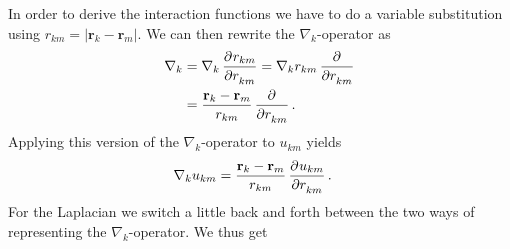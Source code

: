 \documentclass[
    a4paper, aps, twocolumn, floatfix, superscriptaddress]{revtex4-1}
\newcommand{\vf}{\mathbf}
\newcommand{\1}{\mathds{1}}
\begin{document}
            In order to derive the interaction functions we have to do a
            variable substitution using $r_{km} = |\vf{r}_k - \vf{r}_m|$. We can
            then rewrite the $\nabla_k$-operator as
            \begin{align}
                \nabla_k
                &=
                \nabla_k
                \dpd[]{r_{km}}{r_{km}}
                =
                \nabla_k r_{km} \dpd[]{}{r_{km}}
                \\
                &=
                \frac{\vf{r}_k - \vf{r}_m}{r_{km}}\dpd[]{}{r_{km}}.
            \end{align}
            Applying this version of the $\nabla_k$-operator to $u_{km}$ yields
            \begin{align}
                \nabla_k u_{km}
                &=
                \frac{\vf{r}_k - \vf{r}_m}{r_{km}}
                \dpd[]{u_{km}}{r_{km}}.
            \end{align}
            For the Laplacian we switch a little back and forth between the two
            ways of representing the $\nabla_k$-operator. We thus get
\end{document}
